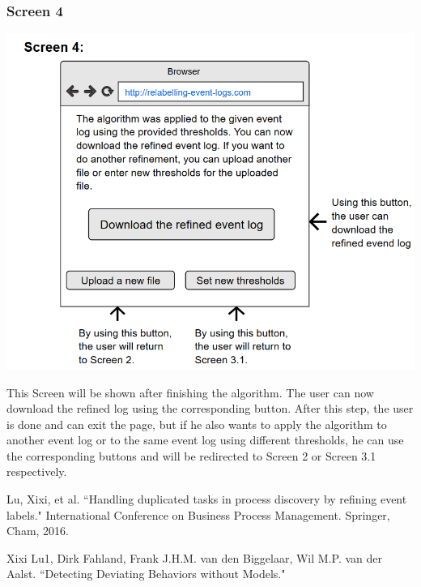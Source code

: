 \documentclass[notitlepage]{article}
\begin{document}
\begin{flushleft}
\subsubsection{Screen 4}
\includegraphics[scale=0.8]{InterfaceMockup4.png}

This Screen will be shown after finishing the algorithm. The user can now download the refined log using the corresponding button. After this step, the user is done and can exit the page, but if he also wants to apply the algorithm to another event log or to the same event log using different thresholds, he can use the corresponding buttons and will be redirected to Screen 2 or Screen 3.1 respectively.


%
%  




\end{flushleft}
%



\begin{thebibliography}{5}
Lu, Xixi, et al. ``Handling duplicated tasks in process discovery by refining event labels." International Conference on Business Process Management. Springer, Cham, 2016.

Xixi Lu1, Dirk Fahland, Frank J.H.M. van den Biggelaar, Wil M.P. van der Aalst. ``Detecting Deviating Behaviors without Models."


\end{thebibliography}
\end{document}
